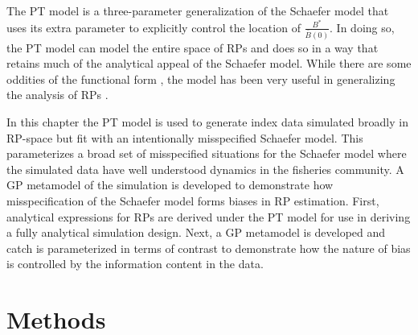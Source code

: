 %
The PT model is a three-parameter generalization of the Schaefer model that uses 
its extra parameter to explicitly control the location of $\frac{B^*}{\bar B(0)}$. 
In doing so, the PT model can model the entire space of RPs and does so in a way that 
retains much of the analytical appeal of the Schaefer model. While there are some oddities
of the functional form \cite{punt_extending_2019, fletcher_restructuring_1978}, the model 
has been very useful in generalizing the analysis of RPs \cite{winker_jabba_2018}.  

%
In this chapter the PT model is used to generate index data simulated broadly 
in RP-space but fit with an intentionally misspecified Schaefer model. This 
parameterizes a broad set of misspecified situations for the Schaefer model 
where the simulated data have well understood dynamics in the fisheries 
community. A GP metamodel of the simulation is developed to demonstrate how 
misspecification of the Schaefer model forms biases in RP estimation. First, 
analytical expressions for RPs are derived under the PT model for use in 
deriving a fully analytical simulation design. Next, a GP metamodel is 
developed and catch is parameterized in terms of contrast to demonstrate 
how the nature of bias is controlled by the information content in the data.

%

\section{Methods \label{meth}}

